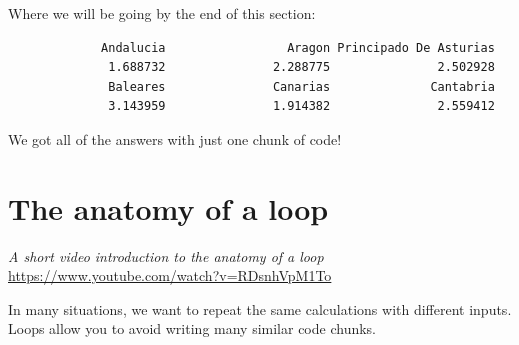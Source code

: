 \documentclass[
  letterpaper,
  DIV=11,
  numbers=noendperiod]{scrreprt}
\newenvironment{Shaded}{\begin{snugshade}}{\end{snugshade}}
\newcommand{\CommentTok}[1]{\textcolor[rgb]{0.37,0.37,0.37}{#1}}
\newcommand{\ConstantTok}[1]{\textcolor[rgb]{0.56,0.35,0.01}{#1}}
\newcommand{\ControlFlowTok}[1]{\textcolor[rgb]{0.00,0.23,0.31}{#1}}
\newcommand{\DecValTok}[1]{\textcolor[rgb]{0.68,0.00,0.00}{#1}}
\newcommand{\FunctionTok}[1]{\textcolor[rgb]{0.28,0.35,0.67}{#1}}
\newcommand{\NormalTok}[1]{\textcolor[rgb]{0.00,0.23,0.31}{#1}}
\newcommand{\OtherTok}[1]{\textcolor[rgb]{0.00,0.23,0.31}{#1}}
\newcommand{\SpecialCharTok}[1]{\textcolor[rgb]{0.37,0.37,0.37}{#1}}
\begin{document}
Where we will be going by the end of this section:

\begin{Shaded}
\end{Shaded}

\begin{verbatim}
             Andalucia                 Aragon Principado De Asturias 
              1.688732               2.288775               2.502928 
              Baleares               Canarias              Cantabria 
              3.143959               1.914382               2.559412 
\end{verbatim}

We got all of the answers with just one chunk of code!

\hypertarget{the-anatomy-of-a-loop}{%
\section{The anatomy of a loop}\label{the-anatomy-of-a-loop}}

\emph{A short video introduction to the anatomy of a loop}
\url{https://www.youtube.com/watch?v=RDsnhVpM1To}

In many situations, we want to repeat the same calculations with
different inputs. Loops allow you to avoid writing many similar code
chunks.
\end{document}
